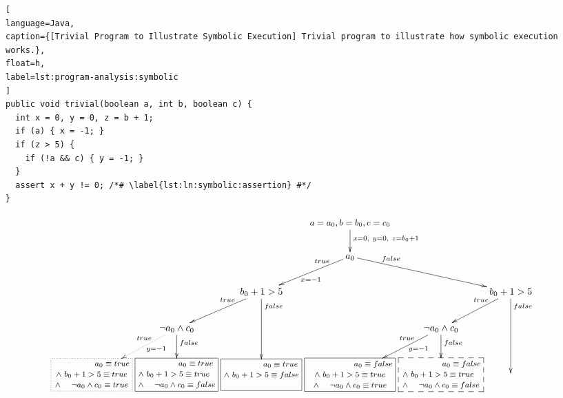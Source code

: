 \begin{lstlisting}[
language=Java,
caption={[Trivial Program to Illustrate Symbolic Execution] Trivial program to illustrate how symbolic execution works.},
float=h,
label=lst:program-analysis:symbolic
]
public void trivial(boolean a, int b, boolean c) {
  int x = 0, y = 0, z = b + 1;
  if (a) { x = -1; }
  if (z > 5) {
    if (!a && c) { y = -1; }
  }
  assert x + y != 0; /*# \label{lst:ln:symbolic:assertion} #*/
}
\end{lstlisting}

\begin{figure}[t]
\[\xymatrix@C=0.3em{
	 & & & \ar[d]^{x = 0,~y = 0,~z = b_{0} + 1} \txt{\small $a = a_{0},b = b_{0}, c = c_{0}$} \\
	 & & & \ar@{}[ld]_<(0.2){true} \ar[ld]^{x=-1} a_{0} \ar[rrd] \ar@{}[rrd]^<(0.2){false} \\
	 & & \ar@{}[ld]_<(0.2){true} \ar[ld] b_{0} + 1 > 5 \ar[dd] \ar@{}[dd]^<(0.1){false} & & & \ar@{}[ld]_<(0.2){true} \ar[ld] b_{0} + 1 > 5 \ar[dd] \ar@{}[dd]^<(0.1){false} \\ 
	 & \ar@{}[ld]_<(0.2){true} \ar@{.>}[ld]^>(0.5){y=-1} \neg a_{0} \land c_{0} \ar[d] \ar@{}[d]^<(0.2){false} & & & \ar@{}[ld]_<(0.2){true} \ar[ld]^>(0.5){y=-1} \neg a_{0} \land c_{0} \ar[d] \ar@{}[d]^<(0.2){false} & & & \\
	 *+[F.] \txt{\footnotesize $~~~~~~~~~~~~~~~a_{0} \equiv true$ 
	 \\ \footnotesize $\land ~b_{0}+1 > 5 \equiv true$ 
	 \\ \footnotesize $\land ~~~~\neg a_{0} \land c_{0} \equiv true$} & 
	 *+[F] \txt{\footnotesize $~~~~~~~~~~~~~~a_{0} \equiv true$ 
	 \\ \footnotesize $\land ~b_{0}+1 > 5 \equiv true~~$ 
	 \\ \footnotesize $\land ~~~~\neg a_{0} \land c_{0} \equiv false$} & 
	 *+[F] \txt{\footnotesize $~~~~~~~~~~~~~~a_{0} \equiv true$ 
	 \\ \footnotesize $\land ~b_{0}+1 > 5 \equiv false$
	 \\ ~} & 
	 *+[F] \txt{\footnotesize $~~~~~~~~~~~~~~~~~a_{0} \equiv false$ 
	 \\ \footnotesize $\land ~b_{0}+1 > 5 \equiv true$ 
	 \\ \footnotesize $~\land ~~~~\neg a_{0} \land c_{0} \equiv true ~$} &
	 *+[F--] \txt{\footnotesize $~~~~~~~~~~~~~~~a_{0} \equiv false$ 
	 \\ \footnotesize $\land ~b_{0}+1 > 5 \equiv true~~$ 
	 \\ \footnotesize $\land ~~~~\neg a_{0} \land c_{0} \equiv false$} &
}\]
\end{figure}
